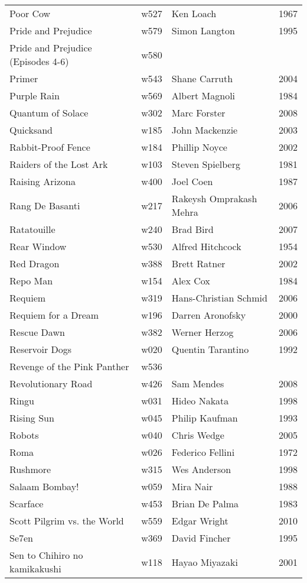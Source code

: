 \documentclass{article}
\begin{document}
\begin {center}
\begin{longtable}{p{10cm} l l l}
Poor Cow & w527 & Ken Loach & 1967 \\
Pride and Prejudice & w579 & Simon Langton & 1995 \\
Pride and Prejudice (Episodes 4-6) & w580 &  &  \\
Primer & w543 & Shane Carruth & 2004 \\
Purple Rain & w569 & Albert Magnoli & 1984 \\
Quantum of Solace & w302 & Marc Forster & 2008 \\
Quicksand & w185 & John Mackenzie & 2003 \\
Rabbit-Proof Fence & w184 & Phillip Noyce & 2002 \\
Raiders of the Lost Ark & w103 & Steven Spielberg & 1981 \\
Raising Arizona & w400 & Joel Coen & 1987 \\
Rang De Basanti & w217 & Rakeysh Omprakash Mehra & 2006 \\
Ratatouille & w240 & Brad Bird & 2007 \\
Rear Window & w530 & Alfred Hitchcock & 1954 \\
Red Dragon & w388 & Brett Ratner & 2002 \\
Repo Man & w154 & Alex Cox & 1984 \\
Requiem & w319 & Hans-Christian Schmid & 2006 \\
Requiem for a Dream & w196 & Darren Aronofsky & 2000 \\
Rescue Dawn & w382 & Werner Herzog & 2006 \\
Reservoir Dogs & w020 & Quentin Tarantino & 1992 \\
Revenge of the Pink Panther & w536 &  &  \\
Revolutionary Road & w426 & Sam Mendes & 2008 \\
Ringu & w031 & Hideo Nakata & 1998 \\
Rising Sun & w045 & Philip Kaufman & 1993 \\
Robots & w040 & Chris Wedge & 2005 \\
Roma & w026 & Federico Fellini & 1972 \\
Rushmore & w315 & Wes Anderson & 1998 \\
Salaam Bombay! & w059 & Mira Nair & 1988 \\
Scarface & w453 & Brian De Palma & 1983 \\
Scott Pilgrim vs. the World & w559 & Edgar Wright & 2010 \\
Se7en & w369 & David Fincher & 1995 \\
Sen to Chihiro no kamikakushi & w118 & Hayao Miyazaki & 2001 \\

\end{longtable}
\end{center}
\end{document}
